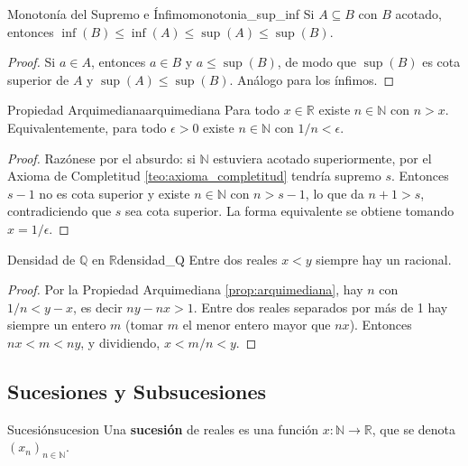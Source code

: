 \documentclass[11pt, a4paper]{article}
\begin{document}
\begin{proposicion}{Monotonía del Supremo e Ínfimo}{monotonia_sup_inf}
Si $A \subseteq B$ con $B$ acotado, entonces $\inf(B) \le \inf(A) \le \sup(A) \le \sup(B)$.
\end{proposicion}

\begin{proof}
Si $a \in A$, entonces $a \in B$ y $a \le \sup(B)$, de modo que $\sup(B)$ es cota superior de $A$ y
$\sup(A) \le \sup(B)$. Análogo para los ínfimos.
\end{proof}

\begin{proposicion}{Propiedad Arquimediana}{arquimediana}
Para todo $x \in \mathbb{R}$ existe $n \in \mathbb{N}$ con $n > x$. Equivalentemente, para todo
$\epsilon > 0$ existe $n \in \mathbb{N}$ con $1/n < \epsilon$.
\end{proposicion}

\begin{proof}
Razónese por el absurdo: si $\mathbb{N}$ estuviera acotado superiormente, por el Axioma de Completitud
\ref{teo:axioma_completitud} tendría supremo $s$.
Entonces $s - 1$ no es cota superior y existe $n \in \mathbb{N}$ con $n > s - 1$, lo que da
$n + 1 > s$, contradiciendo que $s$ sea cota superior. La forma equivalente se obtiene tomando
$x = 1/\epsilon$.
\end{proof}

\begin{proposicion}{Densidad de $\mathbb{Q}$ en $\mathbb{R}$}{densidad_Q}
Entre dos reales $x < y$ siempre hay un racional.
\end{proposicion}

\begin{proof}
Por la Propiedad Arquimediana \ref{prop:arquimediana}, hay $n$ con $1/n < y - x$, es decir
$ny - nx > 1$. Entre dos reales separados por
más de 1 hay siempre un entero $m$ (tomar $m$ el menor entero mayor que $nx$). Entonces
$nx < m < ny$, y dividiendo, $x < m/n < y$.
\end{proof}

\subsection{Sucesiones y Subsucesiones}

\begin{definicion}{Sucesión}{sucesion}
Una \textbf{sucesión} de reales es una función $x: \mathbb{N} \to \mathbb{R}$, que se denota
$(x_n)_{n \in \mathbb{N}}$.
\end{definicion}
\end{document}

